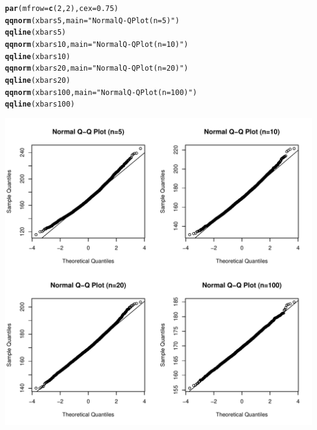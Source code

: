 \documentclass[fleqn]{article}\usepackage[]{graphicx}\usepackage[]{color}
\makeatletter
\def\maxwidth{ %
  \ifdim\Gin@nat@width>\linewidth
    \linewidth
  \else
    \Gin@nat@width
  \fi
}
\newcommand{\hlnum}[1]{\textcolor[rgb]{0.686,0.059,0.569}{#1}}%
\newcommand{\hlstr}[1]{\textcolor[rgb]{0.192,0.494,0.8}{#1}}%
\newcommand{\hlstd}[1]{\textcolor[rgb]{0.345,0.345,0.345}{#1}}%
\newcommand{\hlkwc}[1]{\textcolor[rgb]{0.333,0.667,0.333}{#1}}%
\newcommand{\hlkwd}[1]{\textcolor[rgb]{0.737,0.353,0.396}{\textbf{#1}}}%
\newenvironment{kframe}{%
 \def\at@end@of@kframe{}%
 \ifinner\ifhmode%
  \def\at@end@of@kframe{\end{minipage}}%
  \begin{minipage}{\columnwidth}%
 \fi\fi%
 \def\FrameCommand##1{\hskip\@totalleftmargin \hskip-\fboxsep
 \colorbox{shadecolor}{##1}\hskip-\fboxsep
     \hskip-\linewidth \hskip-\@totalleftmargin \hskip\columnwidth}%
 \MakeFramed {\advance\hsize-\width
   \@totalleftmargin\z@ \linewidth\hsize
   \@setminipage}}%
 {\par\unskip\endMakeFramed%
 \at@end@of@kframe}
\newenvironment{knitrout}{}{} %
\makeatother
\begin{document}
\begin{knitrout}
\color{fgcolor}\begin{kframe}
\begin{alltt}
\hlkwd{par}\hlstd{(}\hlkwc{mfrow}\hlstd{=}\hlkwd{c}\hlstd{(}\hlnum{2}\hlstd{,}\hlnum{2}\hlstd{),} \hlkwc{cex}\hlstd{=}\hlnum{0.75}\hlstd{)}
\hlkwd{qqnorm}\hlstd{(xbars5,} \hlkwc{main}\hlstd{=}\hlstr{"Normal Q-Q Plot (n=5)"}\hlstd{)}
\hlkwd{qqline}\hlstd{(xbars5)}
\hlkwd{qqnorm}\hlstd{(xbars10,} \hlkwc{main}\hlstd{=}\hlstr{"Normal Q-Q Plot (n=10)"}\hlstd{)}
\hlkwd{qqline}\hlstd{(xbars10)}
\hlkwd{qqnorm}\hlstd{(xbars20,} \hlkwc{main}\hlstd{=}\hlstr{"Normal Q-Q Plot (n=20)"}\hlstd{)}
\hlkwd{qqline}\hlstd{(xbars20)}
\hlkwd{qqnorm}\hlstd{(xbars100,} \hlkwc{main}\hlstd{=}\hlstr{"Normal Q-Q Plot (n=100)"}\hlstd{)}
\hlkwd{qqline}\hlstd{(xbars100)}
\end{alltt}
\end{kframe}
\includegraphics[width=\maxwidth]{figure/unnamed-chunk-8-1} 
\end{knitrout}
\end{document}
